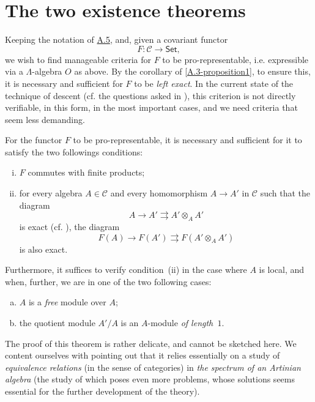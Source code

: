 \documentclass{article}
\theoremstyle{plain}
\newenvironment{theorem}[1]
  {\renewcommand\theinnercustomtheorem{#1}\innercustomtheorem}
  {\endinnercustomtheorem}
\theoremstyle{definition}
\newcommand{\cat}[1]{{\mathcal{#1}}}
\newcommand{\Set}{\mathsf{Set}}
\newcommand{\oldpage}[1]{\marginpar{\footnotesize$\Big\vert$ \textit{p.~#1}}}
\begin{document}
\part{The two existence theorems}
\label{B}

Keeping the notation of \hyperref[A.5]{A.5}, and, given a covariant functor
\[
  F\colon \cat{C} \to \Set,
\]
we wish to find manageable criteria for $F$ to be pro-representable, i.e. expressible via a $\Lambda$-algebra $O$ as above.
By the corollary of \cref{A.3-proposition1}, to ensure this, it is necessary and sufficient for $F$ to be \emph{left exact}.
In the current state of the technique of descent (cf. the questions asked in \cite[p.~9]{3}), this criterion is not directly verifiable, in this form, in the most important cases, and we need criteria that seem less demanding.

\begin{theorem}{1}
\label{B-theorem1}
  For the functor $F$ to be pro-representable, it is necessary and sufficient for it to satisfy the two followings conditions:
  \begin{enumerate}[(i)]
    \item $F$ commutes with finite products;
    \item for every algebra $A\in\cat{C}$ and every homomorphism $A\to A'$ in $\cat{C}$ such that the diagram
      \[
        A \to A' \rightrightarrows A'\otimes_A A'
      \]
      is exact (cf. \cite[A, Definition~1.2]{3}), the diagram
      \[
        F(A) \to F(A') \rightrightarrows F(A'\otimes_A A')
      \]
\oldpage{195-10}
      is also exact.
  \end{enumerate}

  Furthermore, it suffices to verify condition~(ii) in the case where $A$ is local, and when, further, we are in one of the two following cases:
  \begin{enumerate}[(a)]
    \item $A$ is a \emph{free} module over $A$;
    \item the quotient module $A'/A$ is an $A$-module \emph{of length~$1$}.
  \end{enumerate}
\end{theorem}

The proof of this theorem is rather delicate, and cannot be sketched here.
We content ourselves with pointing out that it relies essentially on a study of \emph{equivalence relations} (in the sense of categories) in \emph{the spectrum of an Artinian algebra} (the study of which poses even more problems, whose solutions seems essential for the further development of the theory).
\end{document}
